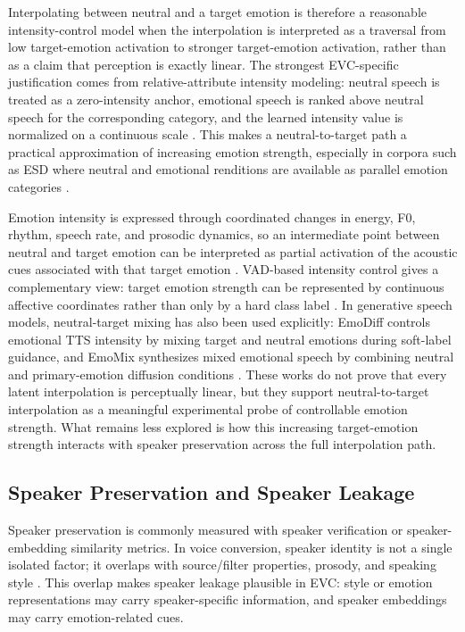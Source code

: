 Interpolating between neutral and a target emotion is therefore a reasonable intensity-control model when the interpolation is interpreted as a traversal from low target-emotion activation to stronger target-emotion activation, rather than as a claim that perception is exactly linear.
The strongest EVC-specific justification comes from relative-attribute intensity modeling: neutral speech is treated as a zero-intensity anchor, emotional speech is ranked above neutral speech for the corresponding category, and the learned intensity value is normalized on a continuous scale \cite{zhou2023emotionintensity}.
This makes a neutral-to-target path a practical approximation of increasing emotion strength, especially in corpora such as ESD where neutral and emotional renditions are available as parallel emotion categories \cite{zhou2021seen,zhou2022evctheoryesd}.

Emotion intensity is expressed through coordinated changes in energy, F0, rhythm, speech rate, and prosodic dynamics, so an intermediate point between neutral and target emotion can be interpreted as partial activation of the acoustic cues associated with that target emotion \cite{zhou2023emotionintensity,zhou2020transforming}.
VAD-based intensity control gives a complementary view: target emotion strength can be represented by continuous affective coordinates rather than only by a hard class label \cite{qi2024einet}.
In generative speech models, neutral-target mixing has also been used explicitly: EmoDiff controls emotional TTS intensity by mixing target and neutral emotions during soft-label guidance, and EmoMix synthesizes mixed emotional speech by combining neutral and primary-emotion diffusion conditions \cite{guo2023emodiff,tang2023emomix}.
These works do not prove that every latent interpolation is perceptually linear, but they support neutral-to-target interpolation as a meaningful experimental probe of controllable emotion strength.
What remains less explored is how this increasing target-emotion strength interacts with speaker preservation across the full interpolation path.

\subsection{Speaker Preservation and Speaker Leakage}
Speaker preservation is commonly measured with speaker verification or speaker-embedding similarity metrics.
In voice conversion, speaker identity is not a single isolated factor; it overlaps with source/filter properties, prosody, and speaking style \cite{sansegundo2017euclidean,belyk2022vocal}.
This overlap makes speaker leakage plausible in EVC: style or emotion representations may carry speaker-specific information, and speaker embeddings may carry emotion-related cues.

